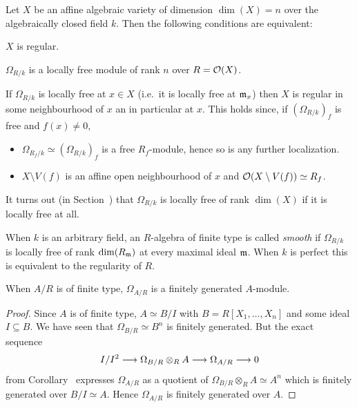 \documentclass[a4paper,parskip=half,numbers=enddot, DIV=12]{scrreprt}
\begin{document}
\begin{prop}
    Let $X$ be an affine algebraic variety of dimension $\dim (X)=n$ over the algebraically closed field $k$. Then the following conditions are equivalent:
    \begin{alphanumerate}
        \item 
            $X$ is regular.
        \item 
            $\Omega_{R/k}$ is a locally free module of rank $n$ over $R= \mathcal{O}(X)$.
    \end{alphanumerate}
\end{prop}
\begin{rem*}
    \begin{alphanumerate}
      \item 
        If $\Omega_{R/k}$ is locally free at $x\in X$ (i.e.\ it is locally free at $\mathfrak{m}_x$) then $X$ is regular in some neighbourhood of $x$ an in particular at $x$. This holds since, if $(\Omega_{R/k})_f$ is free and $f(x)\neq 0$,
        \begin{itemize}
          \item    
            $\Omega_{R_f/k}\simeq(\Omega_{R/k})_f $ is a free $R_f$-module, hence so is any further localization.
          \item 
            $X\setminus V(f)$ is an affine open neighbourhood of $x$ and $\mathcal{O}(X\setminus V(f))\simeq R_f$.
        \end{itemize}
      \item 
        It turns out (in Section~) that $\Omega_{R/k}$ is locally free of rank $\dim(X)$ if it is locally free at all. 
      \item 
        When $k$ is an arbitrary field, an $R$-algebra of finite type is called \emph{smooth} if $\Omega_{R/k}$ is locally free of rank $\dim(R_{\mathfrak{m}})$ at every maximal ideal $\mathfrak{m}$. When $k$ is perfect this is equivalent to the regularity of $R$.
    \end{alphanumerate}
\end{rem*}
\begin{lem}
    When $A/R$ is of finite type, $\Omega_{A/R}$ is a finitely generated $A$-module.
\end{lem}
\begin{proof}
    Since $A$ is of finite type, $A\simeq B/I$ with $B=R[X_1,\ldots,X_n]$ and some ideal $I\subseteq B$. We have seen that $\Omega_{B/R} \simeq B^n$ is finitely generated. But the exact sequence
    \begin{align*}
        I/I^2 \morphism \Omega_{B/R}\otimes_R A \morphism \Omega_{A/R} \morphism 0
    \end{align*}
    from Corollary~ expresses $\Omega_{A/R}$ as a quotient of $\Omega_{B/R}\otimes_R A\simeq A^n$ which is finitely generated over $B/I\simeq A$. Hence $\Omega_{A/R}$ is finitely generated over $A$.
\end{proof}
\end{document}
